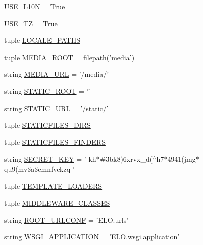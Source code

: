 \begin{DoxyCompactItemize}
\hyperlink{namespaceELO_1_1settings_a863197f2699808509a4c32b38c16eb44}{U\-S\-E\-\_\-\-L10\-N} = True
\item 
\hyperlink{namespaceELO_1_1settings_a8da4c6fc66af84d08bddc0249a473553}{U\-S\-E\-\_\-\-T\-Z} = True
\item 
tuple \hyperlink{namespaceELO_1_1settings_a977570dd2e9cd8142b3d65c4fa37c172}{L\-O\-C\-A\-L\-E\-\_\-\-P\-A\-T\-H\-S}
\item 
tuple \hyperlink{namespaceELO_1_1settings_a7f83b56101acea110bb525439aaa69aa}{M\-E\-D\-I\-A\-\_\-\-R\-O\-O\-T} = \hyperlink{namespaceELO_1_1settings_a7730264ddd478343e0f282f36d4a5ab4}{filepath}('media')
\item 
string \hyperlink{namespaceELO_1_1settings_acd3e1c3559f7c87f5aad004b76458ddc}{M\-E\-D\-I\-A\-\_\-\-U\-R\-L} = '/media/'
\item 
string \hyperlink{namespaceELO_1_1settings_ae5539527ada0171fc602c561493398f4}{S\-T\-A\-T\-I\-C\-\_\-\-R\-O\-O\-T} = ''
\item 
string \hyperlink{namespaceELO_1_1settings_a408323f388e22737eedf90471a3809a4}{S\-T\-A\-T\-I\-C\-\_\-\-U\-R\-L} = '/static/'
\item 
tuple \hyperlink{namespaceELO_1_1settings_aa2272e7a822b45c2101e4f5a958e22a6}{S\-T\-A\-T\-I\-C\-F\-I\-L\-E\-S\-\_\-\-D\-I\-R\-S}
\item 
tuple \hyperlink{namespaceELO_1_1settings_a3e4decd51fab7bd5bdbdb12aac13b70a}{S\-T\-A\-T\-I\-C\-F\-I\-L\-E\-S\-\_\-\-F\-I\-N\-D\-E\-R\-S}
\item 
string \hyperlink{namespaceELO_1_1settings_a13a984a190c7599ab7343322ab098d6d}{S\-E\-C\-R\-E\-T\-\_\-\-K\-E\-Y} = '-\/kh$\ast$\#3bk8)6xrvx\-\_\-d($^\wedge$h7$\ast$4941(jmg$\ast$qu9(mv\$a\$cmnfvckzq-\/'
\item 
tuple \hyperlink{namespaceELO_1_1settings_a9c876284f3865d5a15a73bedccfe3bb7}{T\-E\-M\-P\-L\-A\-T\-E\-\_\-\-L\-O\-A\-D\-E\-R\-S}
\item 
tuple \hyperlink{namespaceELO_1_1settings_a968380d6242dca6cc82acb1d806c703d}{M\-I\-D\-D\-L\-E\-W\-A\-R\-E\-\_\-\-C\-L\-A\-S\-S\-E\-S}
\item 
string \hyperlink{namespaceELO_1_1settings_a9c32eb39b369ab243858f8bd495e698b}{R\-O\-O\-T\-\_\-\-U\-R\-L\-C\-O\-N\-F} = 'E\-L\-O.\-urls'
\item 
string \hyperlink{namespaceELO_1_1settings_a065d3c6028b923c4918002832d2527be}{W\-S\-G\-I\-\_\-\-A\-P\-P\-L\-I\-C\-A\-T\-I\-O\-N} = '\hyperlink{namespaceELO_1_1wsgi_a8951c4ea2920440aeeb73c65ab517a5d}{E\-L\-O.\-wsgi.\-application}'
\item 

\end{DoxyCompactItemize}
